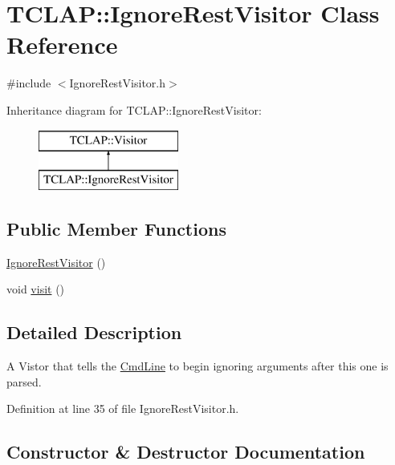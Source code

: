 \hypertarget{class_t_c_l_a_p_1_1_ignore_rest_visitor}{}\section{T\+C\+L\+A\+P\+:\+:Ignore\+Rest\+Visitor Class Reference}
\label{class_t_c_l_a_p_1_1_ignore_rest_visitor}


{\ttfamily \#include $<$Ignore\+Rest\+Visitor.\+h$>$}

Inheritance diagram for T\+C\+L\+A\+P\+:\+:Ignore\+Rest\+Visitor\+:\begin{figure}[H]
\begin{center}
\leavevmode
\includegraphics[height=2.000000cm]{class_t_c_l_a_p_1_1_ignore_rest_visitor}
\end{center}
\end{figure}
\subsection*{Public Member Functions}
\begin{DoxyCompactItemize}
\item 
\hyperlink{class_t_c_l_a_p_1_1_ignore_rest_visitor_a4cd949b7aeff99fba4a8494e02a1cb01}{Ignore\+Rest\+Visitor} ()
\item 
void \hyperlink{class_t_c_l_a_p_1_1_ignore_rest_visitor_ac2a054ed72b16608a32021c65a600722}{visit} ()
\end{DoxyCompactItemize}


\subsection{Detailed Description}
A Vistor that tells the \hyperlink{class_t_c_l_a_p_1_1_cmd_line}{Cmd\+Line} to begin ignoring arguments after this one is parsed. 

Definition at line 35 of file Ignore\+Rest\+Visitor.\+h.



\subsection{Constructor \& Destructor Documentation}
\hypertarget{class_t_c_l_a_p_1_1_ignore_rest_visitor_a4cd949b7aeff99fba4a8494e02a1cb01}{}
